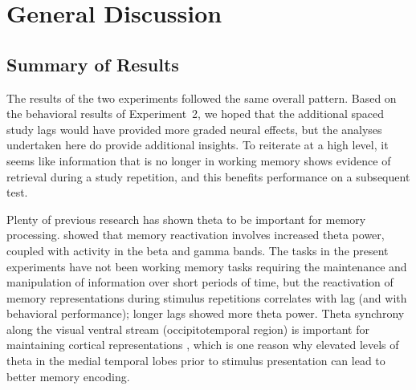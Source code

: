 
\chapter{General Discussion}

\section{Summary of Results}

\cbstart

The results of the two experiments followed the same overall pattern.  Based on the behavioral results of Experiment~2, we hoped that the additional spaced study lags would have provided more graded neural effects, but the analyses undertaken here do provide additional insights.  To reiterate at a high level, it seems like information that is no longer in working memory shows evidence of retrieval during a study repetition, and this benefits performance on a subsequent test.

Plenty of previous research has shown theta to be important for memory processing.
 showed that memory reactivation involves increased theta power, coupled with activity in the beta and gamma bands.
The tasks in the present experiments have not been working memory tasks requiring the maintenance and manipulation of information over short periods of time, but the reactivation of memory representations during stimulus repetitions correlates with lag (and with behavioral performance); longer lags showed more theta power.
Theta synchrony along the visual ventral stream (occipitotemporal region) is important for maintaining cortical representations \cite{DuzeEtal2010}, which is one reason why elevated levels of theta in the medial temporal lobes prior to stimulus presentation can lead to better memory encoding.







